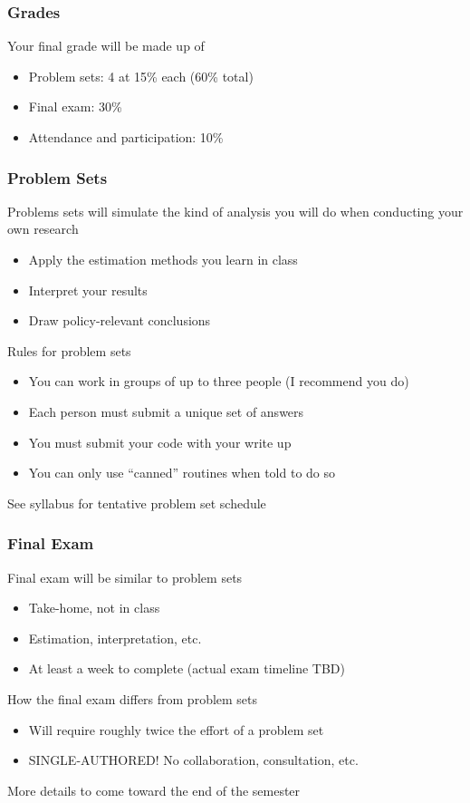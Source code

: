 \documentclass{beamer}\usepackage[]{graphicx}\usepackage[]{color}
\begin{document}
\begin{frame}\frametitle{Grades}
    Your final grade will be made up of
    \begin{itemize}
        \item Problem sets: 4 at 15\% each (60\% total)
        \item Final exam: 30\%
        \item Attendance and participation: 10\%
    \end{itemize}
\end{frame}

\begin{frame}\frametitle{Problem Sets}
    Problems sets will simulate the kind of analysis you will do when conducting your own research
    \begin{itemize}
        \item Apply the estimation methods you learn in class
        \item Interpret your results
        \item Draw policy-relevant conclusions
    \end{itemize}
    \vspace{3ex}
    Rules for problem sets
    \begin{itemize}
        \item You can work in groups of up to three people (I recommend you do)
        \item Each person must submit a unique set of answers
        \item You must submit your code with your write up
        \item You can only use ``canned'' routines when told to do so
    \end{itemize}
    \vspace{3ex}
    See syllabus for tentative problem set schedule
\end{frame}

\begin{frame}\frametitle{Final Exam}
    Final exam will be similar to problem sets
    \begin{itemize}
        \item Take-home, not in class
        \item Estimation, interpretation, etc.
        \item At least a week to complete (actual exam timeline TBD)
    \end{itemize}
    \vspace{3ex}
    How the final exam differs from problem sets
    \begin{itemize}
        \item Will require roughly twice the effort of a problem set
        \item SINGLE-AUTHORED! No collaboration, consultation, etc.
    \end{itemize}
    \vspace{3ex}
    More details to come toward the end of the semester
\end{frame}
\end{document}
